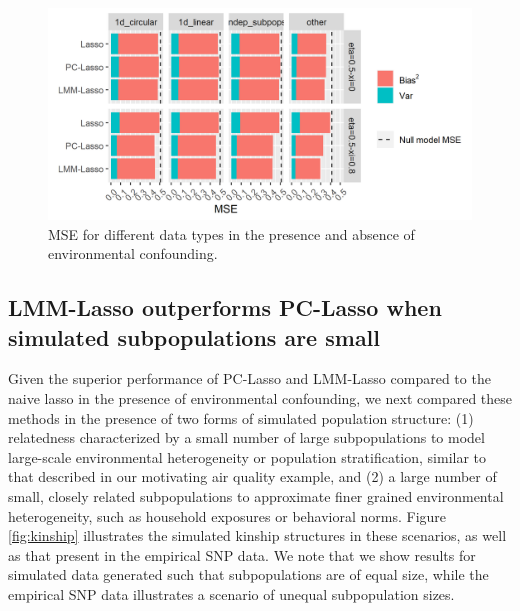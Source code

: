 

\begin{figure}[H]
    \centering
    \includegraphics[scale = 1.1]{figures/beta_mse.png}
    \caption{MSE for different data types in the presence and absence of environmental confounding. }
    \label{fig:mse}
\end{figure}


\subsection{LMM-Lasso outperforms PC-Lasso when simulated subpopulations are small}


Given the superior performance of PC-Lasso and LMM-Lasso compared to the naive lasso in the presence of environmental confounding, we next compared these methods in the presence of two forms of simulated population structure: (1) relatedness characterized by a small number of large subpopulations to model large-scale environmental heterogeneity or population stratification, similar to that described in our motivating air quality example, and (2) a large number of small, closely related subpopulations to approximate finer grained environmental heterogeneity, such as household exposures or behavioral norms. Figure \ref{fig:kinship} illustrates the simulated kinship structures in these scenarios, as well as that present in the empirical SNP data. We note that we show results for simulated data generated such that subpopulations are of equal size, while the empirical SNP data illustrates a scenario of unequal subpopulation sizes.

